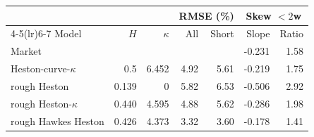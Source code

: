 \begin{tabular}{lrrrrrr}
\toprule
 & & & \multicolumn{2}{c}{RMSE (\%)} & \multicolumn{2}{c}{Skew $<2$w}\\
\cmidrule(lr){4-5}\cmidrule(lr){6-7}
Model & $H$ & $\kappa$ & All & Short & Slope & Ratio\\
\midrule
Market & & & & & -0.231 & 1.58\\
\addlinespace
Heston-curve-$\kappa$ & 0.5 & 6.452 & 4.92 & 5.61 & -0.219 & 1.75\\
rough Heston & 0.139 & 0 & 5.82 & 6.53 & -0.506 & 2.92\\
rough Heston-$\kappa$ & 0.440 & 4.595 & 4.88 & 5.62 & -0.286 & 1.98\\
rough Hawkes Heston & 0.426 & 4.373 & 3.32 & 3.60 & -0.178 & 1.41\\
\bottomrule
\end{tabular}
